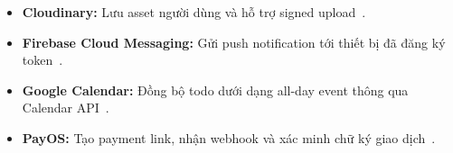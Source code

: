 \begin{itemize}
    \item \textbf{Cloudinary:} Lưu asset người dùng và hỗ trợ signed upload~\cite{cloudinaryjava}.
    \item \textbf{Firebase Cloud Messaging:} Gửi push notification tới thiết bị đã đăng ký token~\cite{firebasefcm}.
    \item \textbf{Google Calendar:} Đồng bộ todo dưới dạng all-day event thông qua Calendar API~\cite{googlecalendarjava}.
    \item \textbf{PayOS:} Tạo payment link, nhận webhook và xác minh chữ ký giao dịch~\cite{payoswebhook}.
\end{itemize}
